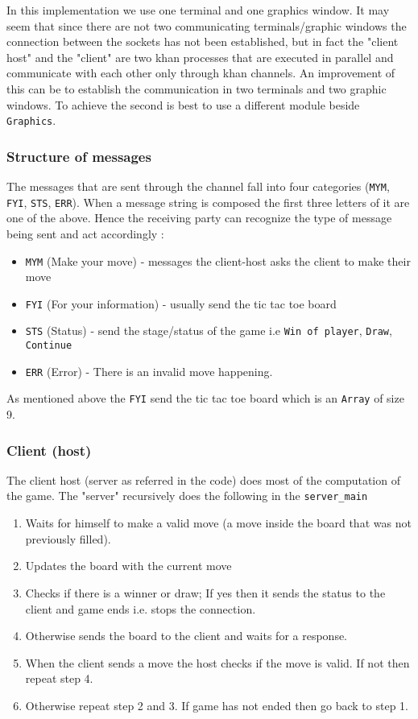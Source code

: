 \documentclass{article}
\begin{document}

In this implementation we use one terminal and one graphics window. It may seem that since there are not two communicating terminals/graphic windows the connection between the sockets has not been established, but in fact the "client host" and the "client" are two khan processes that are executed in parallel and communicate with each other only through khan channels. An improvement of this can be to establish the communication in two terminals and two graphic windows. To achieve the second is best to use a different module beside \texttt{Graphics}. 

\subsubsection{Structure of messages}
The messages that are sent through the channel fall into four categories (\texttt{MYM}, \texttt{FYI}, \texttt{STS}, \texttt{ERR}). When a message string is composed the first three letters of it are one of the above. Hence the receiving party can recognize the type of message being sent and act accordingly :
\begin{itemize}
\item \texttt{MYM} (Make your move) - messages the client-host asks the client to make their move
\item \texttt{FYI} (For your information) - usually send the tic tac toe board
\item \texttt{STS} (Status) - send the stage/status of the game i.e \texttt{Win of player}, \texttt{Draw}, \texttt{Continue}
\item \texttt{ERR} (Error) - There is an invalid move happening.
\end{itemize} 
As mentioned above the \texttt{FYI} send the tic tac toe board which is an \texttt{Array} of size 9. 
\subsubsection{Client (host)}
The client host (server as referred in the code) does most of the computation of the game.  The "server" recursively does the following in the \texttt{server\_main}
\begin{enumerate}
\item Waits for himself to make a valid move (a move inside the board that was not previously filled).
\item Updates the board with the current move
\item Checks if there is a winner or draw; If yes then it sends the status to the client and game ends i.e. stops the connection.
\item Otherwise sends the board to the client and waits for a response.
\item When the client sends a move the host checks if the move is valid. If not then repeat step 4. 
\item Otherwise repeat step 2 and 3. If game has not ended then go back to step 1.
\end{enumerate}
\end{document}
